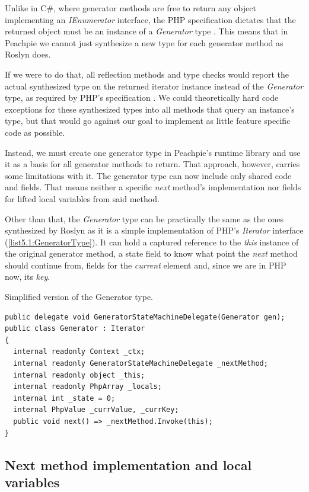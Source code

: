 Unlike in C\#, where generator methods are free to return any object implementing an \emph{IEnumerator} interface, the PHP specification dictates that the returned object must be an instance of a \emph{Generator} type \citep{GenPHP, GenPHPRFC}. This means that in Peachpie we cannot just synthesize a new type for each generator method as Roslyn does.

If we were to do that, all reflection methods and type checks would report the actual synthesized type on the returned iterator instance instead of the \emph{Generator} type, as required by PHP’s specification . We could theoretically hard code exceptions for these synthesized types into all methods that query an instance’s type, but that would go against our goal to implement as little feature specific code as possible.

Instead, we must create one generator type in Peachpie’s runtime library and use it as a basis for all generator methods to return. That approach, however, carries some limitations with it. The generator type can now include only shared code and fields. That means neither a specific \emph{next} method’s implementation nor fields for lifted local variables from said method.

Other than that, the \emph{Generator} type can be practically the same as the ones synthesized by Roslyn as it is a simple implementation of PHP's \emph{Iterator} interface (\autoref{list5.1:GeneratorType}). It can hold a captured reference to the \emph{this} instance of the original generator method, a state field to know what point the \emph{next} method should continue from,  fields for the \emph{current} element and, since we are in PHP now, its \emph{key}.

\begin{listing}[H]
\caption{Simplified version of the Generator type.}
\label{list5.1:GeneratorType}
\begin{verbatim}
public delegate void GeneratorStateMachineDelegate(Generator gen);
public class Generator : Iterator
{
  internal readonly Context _ctx;
  internal readonly GeneratorStateMachineDelegate _nextMethod;
  internal readonly object _this;
  internal readonly PhpArray _locals;
  internal int _state = 0;
  internal PhpValue _currValue, _currKey;
  public void next() => _nextMethod.Invoke(this);
}
\end{verbatim}
\end{listing}

\subsection{Next method implementation and local variables}

